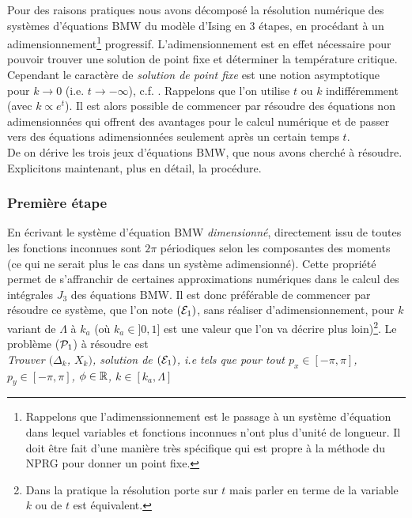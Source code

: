 \documentclass[10.5pt]{article}
\begin{document}
\begin{multicols}{2}
Pour des raisons pratiques nous avons décomposé la résolution numérique des systèmes d'équations BMW du modèle d'Ising en 3 étapes, en procédant à un adimensionnement\footnote{Rappelons que l'adimenssionnement est le passage à un système d'équation dans lequel variables et fonctions inconnues n'ont plus d'unité de longueur. Il doit être fait d'une manière très spécifique qui est propre à la méthode du NPRG pour donner un point fixe.} progressif. L'adimensionnement est en effet nécessaire pour pouvoir trouver une solution de point fixe et déterminer la température critique. Cependant le caractère de \textit{solution de point fixe} est une notion asymptotique pour $k \to 0$ (i.e. $t \to -\infty$), c.f. . Rappelons que l'on utilise $t$ ou $k$ indifféremment (avec $k \propto e^t$). Il est alors possible de commencer par résoudre des équations non adimensionnées qui offrent des avantages pour le calcul numérique et de passer vers des équations adimensionnées seulement après un certain temps $t$.  \\
\indent
De  on dérive les trois jeux d'équations BMW, que nous avons cherché à résoudre. Explicitons maintenant, plus en détail, la procédure.



\subsubsection{Première étape}

En écrivant le système d'équation BMW \textit{dimensionné}, directement issu de  toutes les fonctions inconnues sont $2\pi$ périodiques selon les composantes des moments (ce qui ne serait plus le cas dans un système adimensionné). Cette propriété permet de s'affranchir de certaines approximations numériques dans le calcul des intégrales $J_3$ des équations BMW. Il est donc préférable de commencer par résoudre ce système, que l'on note $(\mathcal{E}_1)$, sans réaliser d'adimensionnement, pour $k$ variant de $\Lambda$ à $k_a$ (où $k_a \in ]0, 1]$ est une valeur que l'on va décrire plus loin)\footnote{Dans la pratique la résolution porte sur $t$ mais parler en terme de la variable $k$ ou de $t$ est équivalent.}. Le problème ($\mathcal{P}_1$) à résoudre est  \\

\noindent
{\itshape Trouver $(\Delta_k$, $X_k)$, solution de $(\mathcal{E}_1)$, i.e tels que pour tout $p_x \in [-\pi, \pi]$, $p_y \in [-\pi, \pi]$, $\phi \in \mathbb{R}$, $k\in [k_a, \Lambda]$}



\end{multicols}
\end{document}
